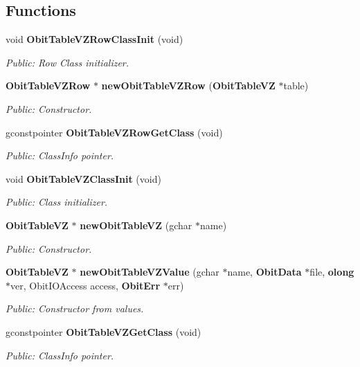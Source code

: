 \subsection*{Functions}
\begin{CompactItemize}
\item 
void {\bf Obit\-Table\-VZRow\-Class\-Init} (void)
\begin{CompactList}\small\item\em Public: Row Class initializer. \item\end{CompactList}\item 
{\bf Obit\-Table\-VZRow} $\ast$ {\bf new\-Obit\-Table\-VZRow} ({\bf Obit\-Table\-VZ} $\ast$table)
\begin{CompactList}\small\item\em Public: Constructor. \item\end{CompactList}\item 
gconstpointer {\bf Obit\-Table\-VZRow\-Get\-Class} (void)
\begin{CompactList}\small\item\em Public: Class\-Info pointer. \item\end{CompactList}\item 
void {\bf Obit\-Table\-VZClass\-Init} (void)
\begin{CompactList}\small\item\em Public: Class initializer. \item\end{CompactList}\item 
{\bf Obit\-Table\-VZ} $\ast$ {\bf new\-Obit\-Table\-VZ} (gchar $\ast$name)
\begin{CompactList}\small\item\em Public: Constructor. \item\end{CompactList}\item 
{\bf Obit\-Table\-VZ} $\ast$ {\bf new\-Obit\-Table\-VZValue} (gchar $\ast$name, {\bf Obit\-Data} $\ast$file, {\bf olong} $\ast$ver, Obit\-IOAccess access, {\bf Obit\-Err} $\ast$err)
\begin{CompactList}\small\item\em Public: Constructor from values. \item\end{CompactList}\item 
gconstpointer {\bf Obit\-Table\-VZGet\-Class} (void)
\begin{CompactList}\small\item\em Public: Class\-Info pointer. \item\end{CompactList}\item 

\end{CompactItemize}
